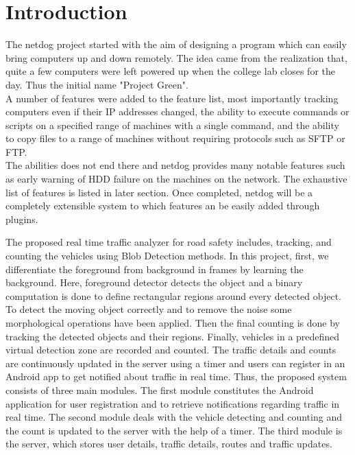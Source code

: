 \chapter{Introduction}
	
\par
The netdog project started with the aim of designing a program which can easily
bring computers up and down remotely. The idea came from the realization that,
quite a few computers were left powered up when the college lab closes for the
day. Thus the initial name "Project Green".\\

A number of features were added to the feature list, most importantly tracking
computers even if their IP addresses changed, the ability to execute commands
or scripts on a specified range of machines with a single command, and the
ability to copy files to a range of machines without requiring protocols such
as SFTP or FTP.\\

The abilities does not end there and netdog provides many notable features such
as early warning of HDD failure on the machines on the network. The exhaustive
list of features is listed in later section. Once completed, netdog will be
a completely extensible system to which features an be easily added through
plugins.\\
\newpage 


The proposed real time traffic analyzer for road safety includes, tracking, and counting the vehicles using Blob Detection methods. In this project, first, we differentiate the foreground from background in frames by learning the background. Here, foreground detector detects the object and a binary computation is done to define rectangular regions around every detected object. To detect the moving object correctly and to remove the noise some morphological operations have been applied. Then the final counting is done by tracking the detected objects and their regions. Finally, vehicles in a predefined virtual detection zone are recorded and counted. The traffic details and counts are continuously updated in the server using a timer and users can register in an Android app to get notified about traffic in real time. Thus, the proposed system consists of three main modules. The first module constitutes the Android application for user registration and to retrieve notifications regarding traffic in real time. The second module deals with the vehicle detecting and counting and the count is updated to the server with the help of a timer. The third module is the server, which stores user details, traffic details, routes and traffic updates. 

